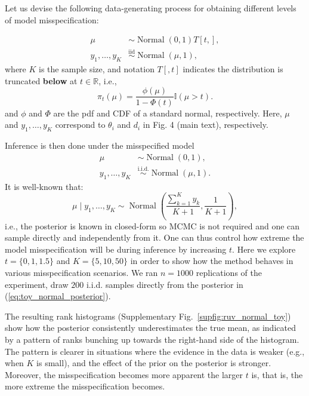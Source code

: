 \documentclass[oneside]{article}
\begin{document}
Let us devise the following data-generating process for obtaining different levels of model misspecification:

\begin{align*}
 \mu & \sim \operatorname{Normal}\left(0, 1\right)T[t, ],\\
  y_1, \ldots, y_K & \overset{\text{iid}}{\sim} \operatorname{Normal}\left(\mu, 1\right),
\end{align*}
where $K$ is the sample size, and notation $T[, t]$ indicates the distribution is truncated \textbf{below} at $t \in \mathbb{R}$, i.e.,
\begin{equation*}
    \pi_{t}(\mu) = \frac{\phi(\mu)}{1 - \Phi(t)} \mathbb{I}(\mu > t).
\end{equation*}
and $\phi$ and $\Phi$ are the pdf and CDF of a standard normal, respectively.
Here, $\mu$ and $y_1, \ldots, y_K$ correspond to $\theta_i$ and $d_i$ in Fig. 4 (main text), respectively.

Inference is then done under the misspecified model
\begin{align*}
 \mu & \sim \operatorname{Normal}\left(0, 1\right),\\
  y_1, \ldots, y_K & \overset{\text{i.i.d.}}{\sim} \operatorname{Normal}\left(\mu, 1\right).
\end{align*}
It is well-known that:
\begin{equation}
\label{eq:toy_normal_posterior}
    \mu \mid y_1, \ldots, y_K \sim \operatorname{Normal}\left( \frac{\sum_{k = 1}^K y_k}{K + 1},  \frac{1}{K + 1} \right),
\end{equation}
i.e., the posterior is known in closed-form so MCMC is not required and one can sample directly and independently from it.
One can thus control how extreme the model misspecification will be during inference by increasing $t$.
Here we explore $t =  \{0, 1, 1.5\}$ and $K = \{5, 10 , 50\}$ in order to show how the method behaves in various misspecification scenarios.
We ran $n=1000$ replications of the experiment, draw $200$ i.i.d. samples directly from the posterior in (\ref{eq:toy_normal_posterior}).

The resulting rank histograms (Supplementary Fig.~\ref{supfig:ruv_normal_toy}) show how the posterior consistently underestimates the true mean, as indicated by a pattern of ranks bunching up towards the right-hand side of the histogram.
The pattern is clearer in situations where the evidence in the data is weaker (e.g., when $K$ is small), and the effect of the prior on the posterior is stronger.
Moreover, the misspecification becomes more apparent the larger $t$ is, that is, the more extreme the misspecification becomes.
\end{document}
